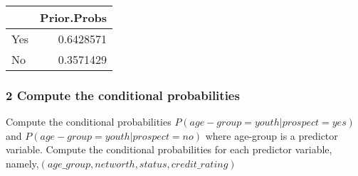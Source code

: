 \documentclass[]{article}
\begin{document}
\begin{longtable}[]{@{}lr@{}}
\toprule
& Prior.Probs\tabularnewline
\midrule
\endhead
Yes & 0.6428571\tabularnewline
No & 0.3571429\tabularnewline
\bottomrule
\end{longtable}

\subsubsection{2 Compute the conditional
probabilities}\label{compute-the-conditional-probabilities}

Compute the conditional probabilities
\(P(age-group=youth|prospect=yes)\) and
\(P(age-group=youth|prospect=no)\) where age-group is a predictor
variable. Compute the conditional probabilities for each predictor
variable, namely,\((age\_group,networth,status,credit\_rating)\)
\end{document}
